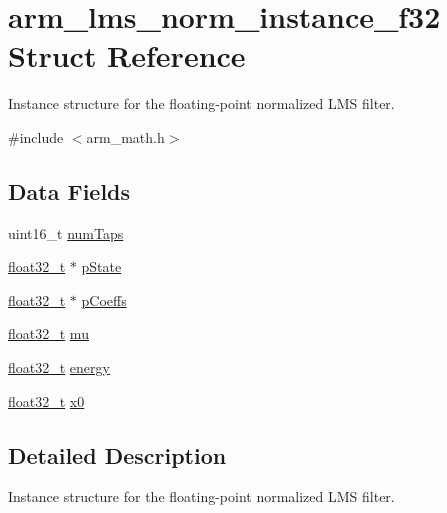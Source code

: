 \hypertarget{structarm__lms__norm__instance__f32}{}\section{arm\+\_\+lms\+\_\+norm\+\_\+instance\+\_\+f32 Struct Reference}
\label{structarm__lms__norm__instance__f32}


Instance structure for the floating-\/point normalized L\+MS filter.  




{\ttfamily \#include $<$arm\+\_\+math.\+h$>$}

\subsection*{Data Fields}
\begin{DoxyCompactItemize}
\item 
uint16\+\_\+t \mbox{\hyperlink{structarm__lms__norm__instance__f32_a751941891e47f522a7f5375fe8990aac}{num\+Taps}}
\item 
\mbox{\hyperlink{arm__math_8h_a4611b605e45ab401f02cab15c5e38715}{float32\+\_\+t}} $\ast$ \mbox{\hyperlink{structarm__lms__norm__instance__f32_a335c87e6fdc4b96601d95a5de8b9c463}{p\+State}}
\item 
\mbox{\hyperlink{arm__math_8h_a4611b605e45ab401f02cab15c5e38715}{float32\+\_\+t}} $\ast$ \mbox{\hyperlink{structarm__lms__norm__instance__f32_aacbb8dd8eeba4b21fc2bb40076405ee3}{p\+Coeffs}}
\item 
\mbox{\hyperlink{arm__math_8h_a4611b605e45ab401f02cab15c5e38715}{float32\+\_\+t}} \mbox{\hyperlink{structarm__lms__norm__instance__f32_a11402afa7c9b9dac4cb953fa386e74d2}{mu}}
\item 
\mbox{\hyperlink{arm__math_8h_a4611b605e45ab401f02cab15c5e38715}{float32\+\_\+t}} \mbox{\hyperlink{structarm__lms__norm__instance__f32_ae1ed544b72f1510ed55d144a9424fddd}{energy}}
\item 
\mbox{\hyperlink{arm__math_8h_a4611b605e45ab401f02cab15c5e38715}{float32\+\_\+t}} \mbox{\hyperlink{structarm__lms__norm__instance__f32_ab56b6f83c5b324c3ef620474b6e5a6e1}{x0}}
\end{DoxyCompactItemize}


\subsection{Detailed Description}
Instance structure for the floating-\/point normalized L\+MS filter. 

